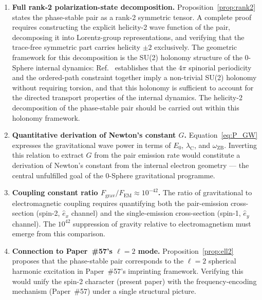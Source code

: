 \documentclass[%
 reprint, amsmath,amssymb, aps, prb, ]{revtex4-2}
\numberwithin{equation}{section}
\newcommand{\omZB}{\omega_{\text{ZB}}}
\newcommand{\lambdaC}{\lambda_{\mathrm{C}}}
\newcommand{\ehat}[1]{\hat{e}_{#1}}
\begin{document}
\begin{enumerate}[label=(\Roman*), leftmargin=2em]

\item \textbf{Full rank-2 polarization-state decomposition.}
Proposition~\ref{prop:rank2} states the phase-stable pair as a rank-2 symmetric tensor.
A complete proof requires constructing the explicit helicity-2 wave function of the pair, decomposing it into Lorentz-group representations, and verifying that the trace-free symmetric part carries helicity $\pm 2$ exclusively.
The geometric framework for this decomposition is the SU(2) holonomy structure of the 0-Sphere internal dynamics: Ref.~\cite{hanamura45} establishes that the $4\pi$ spinorial periodicity and the ordered-path constraint together imply a non-trivial SU(2) holonomy without requiring torsion, and that this holonomy is sufficient to account for the directed transport properties of the internal dynamics. The helicity-2 decomposition of the phase-stable pair should be carried out within this holonomy framework.

\item \textbf{Quantitative derivation of Newton's constant $G$.}
Equation~\eqref{eq:P_GW} expresses the gravitational wave power in terms of $E_0$, $\lambdaC$, and $\omZB$.
Inverting this relation to extract $G$ from the pair emission rate would constitute a derivation of Newton's constant from the internal electron geometry --- the central unfulfilled goal of the 0-Sphere gravitational programme.

\item \textbf{Coupling constant ratio $F_\mathrm{grav}/F_\mathrm{EM} \approx 10^{-42}$.}
The ratio of gravitational to electromagnetic coupling requires quantifying both the pair-emission cross-section (spin-2, $\ehat{x}$ channel) and the single-emission cross-section (spin-1, $\ehat{y}$ channel).
The $10^{42}$ suppression of gravity relative to electromagnetism must emerge from this comparison.

\item \textbf{Connection to Paper~\#57's $\ell = 2$ mode.}
Proposition~\ref{prop:ell2} proposes that the phase-stable pair corresponds to the $\ell = 2$ spherical harmonic excitation in Paper~\#57's imprinting framework.
Verifying this would unify the spin-2 character (present paper) with the frequency-encoding mechanism (Paper~\#57) under a single structural picture.

\end{enumerate}
\end{document}
